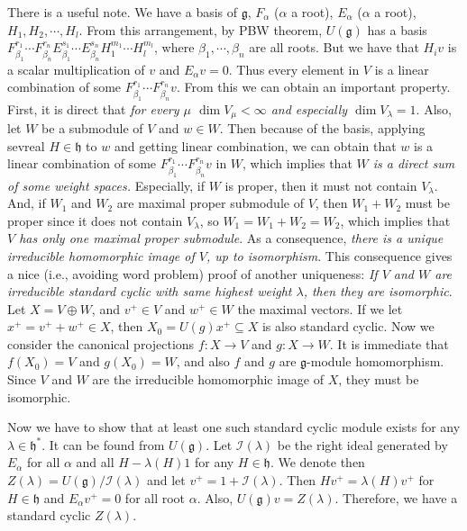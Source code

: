 \documentclass{article}
\newcommand{\lie}[1]{\mathfrak{#1}}
\begin{document}
There is a useful note.
We have a basis of $\lie{g}$, $F_\alpha$ ($\alpha$ a root), $E_\alpha$ ($\alpha$ a root), $H_1, H_2, \cdots, H_l$.
From this arrangement, by PBW theorem, $U(\lie{g})$ has a basis $F_{\beta_1}^{r_1} \cdots F_{\beta_n}^{r_n} E_{\beta_1}^{s_1} \cdots E_{\beta_n}^{s_n} H_1^{m_1} \cdots H_l^{m_l}$, where $\beta_1, \cdots, \beta_n$ are all roots.
But we have that $H_i v$ is a scalar multiplication of $v$ and $E_\alpha v = 0$.
Thus every element in $V$ is a linear combination of some $F_{\beta_1}^{r_1} \cdots F_{\beta_n}^{r_n} v$.
From this we can obtain an important property.
First, it is direct that \textit{for every $\mu$ $\dim{V_\mu} < \infty$ and especially $\dim{V_\lambda} = 1$}.
Also, let $W$ be a submodule of $V$ and $w \in W$.
Then because of the basis, applying sevreal $H \in \lie{h}$ to $w$ and getting linear combination, we can obtain that $w$ is a linear combination of some $F_{\beta_1}^{r_1} \cdots F_{\beta_n}^{r_n} v$ in $W$, which implies that \textit{$W$ is a direct sum of some weight spaces.}
Especially, if $W$ is proper, then it must not contain $V_\lambda$.
And, if $W_1$ and $W_2$ are maximal proper submodule of $V$, then $W_1 + W_2$ must be proper since it does not contain $V_\lambda$, so $W_1 = W_1 + W_2 = W_2$, which implies that \textit{$V$ has only one maximal proper submodule}.
As a consequence, \textit{there is a unique irreducible homomorphic image of $V$, up to isomorphism}.
This consequence gives a nice (i.e., avoiding word problem) proof of another uniqueness: \textit{If $V$ and $W$ are irreducible standard cyclic with same highest weight $\lambda$, then they are isomorphic}.
Let $X = V \oplus W$, and $v^+ \in V$ and $w^+ \in W$ the maximal vectors.
If we let $x^+ = v^+ + w^+ \in X$, then $X_0 = U(g)x^+ \subseteq X$ is also standard cyclic.
Now we consider the canonical projections $f : X \to V$ and $g : X \to W$.
It is immediate that $f(X_0) = V$ and $g(X_0) = W$, and also $f$ and $g$ are $\lie{g}$-module homomorphism.
Since $V$ and $W$ are the irreducible homomorphic image of $X$, they must be isomorphic.

Now we have to show that at least one such standard cyclic module exists for any $\lambda \in \lie{h}^*$.
It can be found from $U(\lie{g})$.
Let $\mathcal{I}(\lambda)$ be the right ideal generated by $E_\alpha$ for all $\alpha$ and all $H - \lambda(H) 1$ for any $H \in \lie{h}$.
We denote then $Z(\lambda) = U(\lie{g})/\mathcal{I}(\lambda)$ and let $v^+ = 1 + \mathcal{I}(\lambda)$.
Then $Hv^+ = \lambda(H) v^+$ for $H \in \lie{h}$ and $E_\alpha v^+ = 0$ for all root $\alpha$.
Also, $U(\lie{g}) v = Z(\lambda)$.
Therefore, we have a standard cyclic $Z(\lambda)$.
\end{document}
